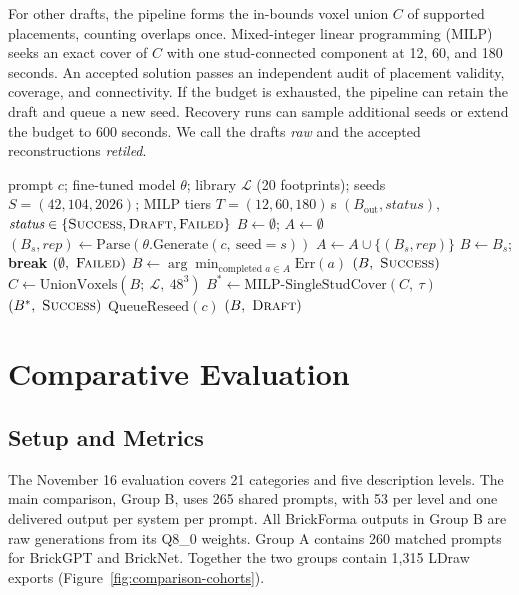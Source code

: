 \documentclass[letterpaper]{article} %
\begin{document}
For other drafts, the pipeline forms the in-bounds voxel union $C$ of supported placements, counting overlaps once. Mixed-integer linear programming (MILP) seeks an exact cover of $C$ with one stud-connected component at 12, 60, and 180 seconds. An accepted solution passes an independent audit of placement validity, coverage, and connectivity. If the budget is exhausted, the pipeline can retain the draft and queue a new seed. Recovery runs can sample additional seeds or extend the budget to 600 seconds. We call the drafts \emph{raw} and the accepted reconstructions \emph{retiled}.
\begin{algorithm}[tb]
\caption{BrickForma inference and retiling}
\label{alg:inference-retiling}
\small
\begin{algorithmic}[1]
\REQUIRE prompt $c$; fine-tuned model $\theta$; library $\mathcal{L}$ (20 footprints); seeds $S=(42,104,2026)$; MILP tiers $T=(12,60,180)$\,s
\ENSURE $(B_{\mathrm{out}}, \textit{status})$, $\textit{status}\in\{\textsc{Success},\textsc{Draft},\textsc{Failed}\}$
\STATE $B \gets \emptyset$; $A \gets \emptyset$
  \STATE $(B_s,\textit{rep}) \gets \mathrm{Parse}(\theta.\mathrm{Generate}(c,\ \mathrm{seed}{=}s))$
  \STATE $A \gets A \cup \{(B_s,\textit{rep})\}$
    \STATE $B \gets B_s$; \textbf{break}
  \ENDIF
\ENDFOR
{}
    \RETURN $(\emptyset,\ \textsc{Failed})$
  \ENDIF
  \STATE $B \gets \arg\min_{\text{completed } a\in A} \mathrm{Err}(a)$
\ENDIF
{}
  \RETURN $(B,\ \textsc{Success})$ 
\ENDIF
\STATE $C \gets \mathrm{UnionVoxels}(B;\ \mathcal{L},\ 48^3)$ 
  \STATE $B^{*} \gets \mathrm{MILP\text{-}SingleStudCover}(C,\ \tau)$
    \RETURN $(B^{*},\ \textsc{Success})$
  \ENDIF
\ENDFOR
\STATE $\mathrm{QueueReseed}(c)$
\RETURN $(B,\ \textsc{Draft})$ 
\end{algorithmic}
\end{algorithm}
\section{Comparative Evaluation}
\label{sec:eval}
\subsection{Setup and Metrics}
\label{sec:setup}
The November 16 evaluation covers 21 categories and five description levels. The main comparison, Group B, uses 265 shared prompts, with 53 per level and one delivered output per system per prompt. All BrickForma outputs in Group B are raw generations from its Q8\_0 weights. Group A contains 260 matched prompts for BrickGPT and BrickNet. Together the two groups contain 1,315 LDraw exports (Figure~\ref{fig:comparison-cohorts}).
\end{document}
